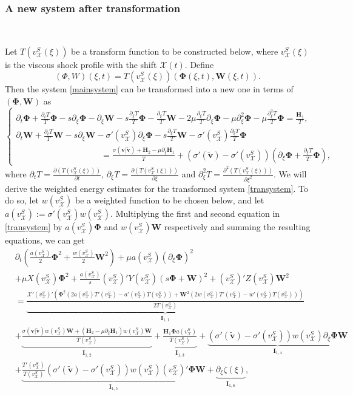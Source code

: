 \documentclass[12pt,reqno]{amsart}
\numberwithin{equation}{section}
\def\p{\partial}
\def\ph{\mathbf{\Phi}}
\def\w{\mathbf{W}}
\def\vsx{v^S_{\mathcal{X}}}
\def\X{\mathcal{X}}
\begin{document}
\subsubsection{A new system after transformation}

\

Let $T(\vsx(\xi))$ be a transform function  to be constructed below, where $\vsx(\xi)$ is the viscous shock profile with the shift $\mathcal{X}(t)$. Define 
\begin{equation}\label{tran}
	(\Phi,W)(\xi,t)=T(\vsx(\xi))(\ph(\xi,t),\w(\xi,t)).
\end{equation}
Then the system \eqref{mainsystem} can be transformed into a new one in terms of $(\ph,\w)$ as
\begin{equation}\label{transystem}
	\begin{cases}
		\p_t\ph+\frac{\p_tT}{T}\ph-s\p_{\xi}\ph-\p_{\xi}\w-s\frac{\p_{\xi}T}{T}\ph-\frac{\p_{\xi}T}{T}\w-2\mu\frac{\p_{\xi}T}{T}\p_{\xi}\ph-\mu\p^2_{\xi}\ph-\mu\frac{\p^2_{\xi}T}{T}\ph=\frac{\mathbf{H}_1}{T},\\
		\p_t\w+\frac{\p_tT}{T}\w-s\p_{\xi}\w-\sigma'(\vsx)\p_{\xi}\ph-s\frac{\p_{\xi}T}{T}\w-\sigma'(\vsx)\frac{\p_{\xi}T}{T}\ph\\
		\qquad\qquad\qquad\qquad\qquad=\frac{\sigma(\mathbf{v}|\mathbf{\tilde{v}})+\mathbf{H}_2-\mu\p_{\xi}\mathbf{H}_1}{T}+(\sigma'(\mathbf{\tilde{v}})-\sigma'(\vsx))(\p_{\xi}\ph+\frac{\p_{\xi}T}{T}\ph),
	\end{cases}
\end{equation}
where $\p_tT=\frac{\partial(T(\vsx(\xi)))}{\partial t}$, $\p_\xi T=\frac{\partial(T(\vsx(\xi)))}{\partial \xi}$ and 
$\p_\xi^2T=\frac{\partial^2(T(\vsx(\xi)))}{\partial\xi^2}$. 
We will derive the weighted energy estimates for the transformed system \eqref{transystem}. To do so, let $w(\vsx)$ be a weighted function to be chosen below, and let $a(\vsx):=\sigma'(\vsx)w(\vsx)$. Multiplying the first and second equation in \eqref{transystem} by $a(\vsx)\ph$ and $w(\vsx)\w$ respectively and summing the resulting equations, we can get
\begin{equation}\label{transe}
	\begin{aligned}
		&\p_t\left(\frac{a(\vsx)}{2}\ph^2+\frac{w(\vsx)}{2}\w^2\right)+\mu a(\vsx)(\p_{\xi}\ph)^2\\
		&+\mu X(\vsx)\ph^2+\frac{a(\vsx)}{s}(\vsx)'Y(\vsx)(s\ph+\w)^2+(\vsx)'Z(\vsx)\w^2\\
		&=\underbrace{\frac{\X'(\vsx)'(\ph^2(2a(\vsx)T'(\vsx)-a'(\vsx)T(\vsx))+\w^2(2w(\vsx)T'(\vsx)-w'(\vsx)T(\vsx)))}{2T(\vsx)}}_{\mathbf{I}_{1,1}}\\
		&+\underbrace{\frac{\sigma(\mathbf{v}|\mathbf{\tilde{v}})w(\vsx)\w+(\mathbf{H}_2-\mu\p_{\xi}\mathbf{H}_1)w(\vsx)\w}{T(\vsx)}}_{\mathbf{I}_{1,2}}+\underbrace{\frac{\mathbf{H}_1\ph a(\vsx)}{T(\vsx)}}_{\mathbf{I}_{1,3}}+\underbrace{(\sigma'(\mathbf{\tilde{v}})-\sigma'(\vsx))w(\vsx)\p_{\xi}\ph\w}_{\mathbf{I}_{1,4}}\\
		&+\underbrace{\frac{T'(\vsx)}{T(\vsx)}(\sigma'(\mathbf{\tilde{v}})-\sigma'(\vsx))w(\vsx)(\vsx)'\ph\w}_{\mathbf{I}_{1,5}}+\underbrace{\p_{\xi}\zeta(\xi)}_{\mathbf{I}_{1,6}},\\
	\end{aligned}
\end{equation}
\end{document}
